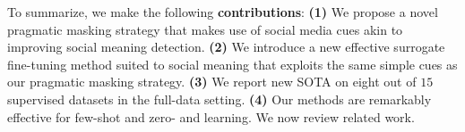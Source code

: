 To summarize, we make the following \textbf{contributions}:
 \textbf{(1)} We propose a novel pragmatic masking strategy that makes use of social media cues akin to improving social meaning detection. \textbf{(2)} We introduce a new effective surrogate fine-tuning method suited to social meaning that exploits the same simple cues as our pragmatic masking strategy. \textbf{(3)} We report new SOTA on eight out of $15$ supervised datasets in the full-data setting. \textbf{(4)} Our methods are remarkably effective for few-shot and zero- and learning. We now review related work.%
 

